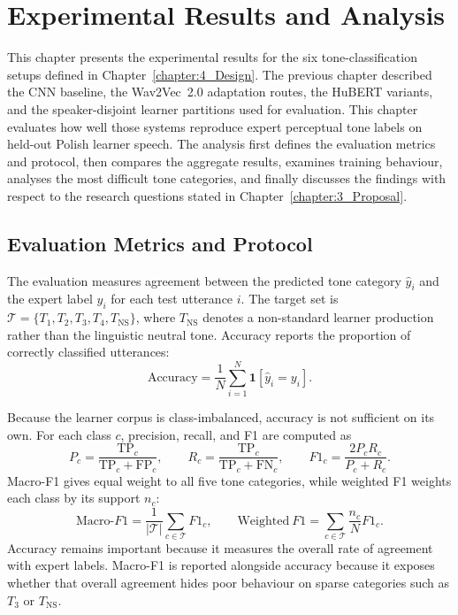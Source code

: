 
\chapter{Experimental Results and Analysis}\label{chapter:5_Experiments}

This chapter presents the experimental results for the six tone-classification
setups defined in Chapter~\ref{chapter:4_Design}. The previous chapter described
the CNN baseline, the Wav2Vec~2.0 adaptation routes, the HuBERT variants, and
the speaker-disjoint learner partitions used for evaluation. This chapter
evaluates how well those systems reproduce expert perceptual tone labels
on held-out Polish learner speech. The analysis first defines the evaluation
metrics and protocol, then compares the aggregate results, examines training
behaviour, analyses the most difficult tone categories, and finally discusses the
findings with respect to the research questions stated in
Chapter~\ref{chapter:3_Proposal}.

\section{Evaluation Metrics and Protocol}
\label{sec:exp:protocol}

The evaluation measures agreement between the predicted tone category
\(\hat{y}_i\) and the expert label \(y_i\) for each test utterance \(i\). The
target set is \(\mathcal{T}=\{T_1,T_2,T_3,T_4,T_{\mathrm{NS}}\}\), where
\(T_{\mathrm{NS}}\) denotes a non-standard learner production rather than the
linguistic neutral tone. Accuracy reports the proportion of correctly classified
utterances:
\begin{equation}
  \mathrm{Accuracy}
  =
  \frac{1}{N}\sum_{i=1}^{N}\mathbf{1}\!\left[\hat{y}_i=y_i\right].
  \label{eq:exp:accuracy}
\end{equation}

Because the learner corpus is class-imbalanced, accuracy is not sufficient on
its own. For each class \(c\), precision, recall, and F1 are computed as
\begin{equation}
  P_c=\frac{\mathrm{TP}_c}{\mathrm{TP}_c+\mathrm{FP}_c},
  \qquad
  R_c=\frac{\mathrm{TP}_c}{\mathrm{TP}_c+\mathrm{FN}_c},
  \qquad
  F1_c=\frac{2P_cR_c}{P_c+R_c}.
  \label{eq:exp:class_f1}
\end{equation}
Macro-F1 gives equal weight to all five tone categories, while weighted F1
weights each class by its support \(n_c\):
\begin{equation}
  \mathrm{Macro}\text{-}F1
  =
  \frac{1}{|\mathcal{T}|}\sum_{c\in\mathcal{T}}F1_c,
  \qquad
  \mathrm{Weighted}\ F1
  =
  \sum_{c\in\mathcal{T}}\frac{n_c}{N}F1_c.
  \label{eq:exp:aggregate_f1}
\end{equation}
Accuracy remains important because it measures the overall rate of agreement
with expert labels. Macro-F1 is reported alongside accuracy because it exposes
whether that overall agreement hides poor behaviour on sparse categories such as
\(T_3\) or \(T_{\mathrm{NS}}\).

